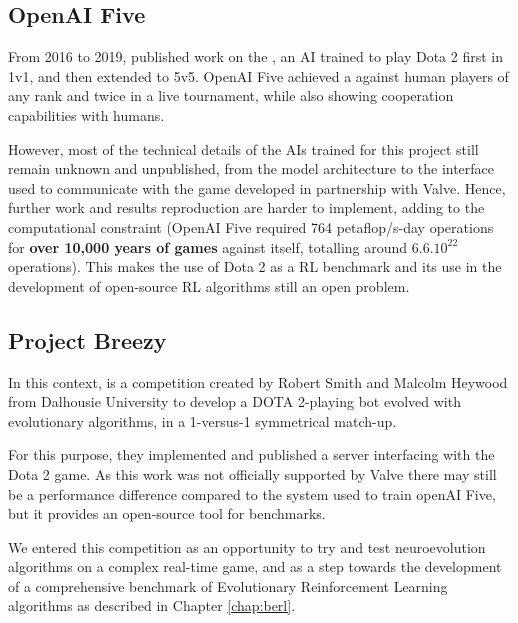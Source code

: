 \subsection{OpenAI Five}
From 2016 to 2019,  published work on the , an AI trained to play Dota 2 first in 1v1, and then extended to 5v5. OpenAI Five achieved a  against human players of any rank and  twice in a live tournament, while also showing cooperation capabilities with humans. 

However, most of the technical details of the AIs trained for this project still remain unknown and unpublished, from the model architecture to the interface used to communicate with the game developed in partnership with Valve. Hence, further work and results reproduction are harder to implement, adding to the computational constraint (OpenAI Five required 764 petaflop/s-day operations for \textbf{over 10,000 years of games} against itself, totalling around $6.6.10^{22}$ operations). This makes the use of Dota 2 as a RL benchmark and its use in the development of open-source RL algorithms still an open problem. 

\subsection{Project Breezy}

In this context,  is a competition created by Robert Smith and Malcolm Heywood from Dalhousie University to develop a DOTA 2-playing bot evolved with evolutionary algorithms, in a 1-versus-1 symmetrical match-up. 

For this purpose, they implemented and published a server interfacing with the Dota 2 game. As this work was not officially supported by Valve there may still be a performance difference compared to the system used to train openAI Five, but it provides an open-source tool for benchmarks.

We entered this competition as an opportunity to try and test neuroevolution algorithms on a complex real-time game, and as a step towards the development of a comprehensive benchmark of Evolutionary Reinforcement Learning algorithms as described in Chapter \ref{chap:berl}.

